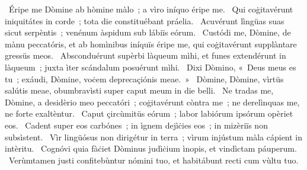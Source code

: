 \psalmChapterWithInscription{}
{ }
{%
~Éripe me Dòmine ab hòmine màlo~; a vìro iníquo éripe me. 
~Qui coġitavérunt iniquitátes in corde~; tota die constituébant práelia. 
~Acuvérunt lìngüas suas sicut serpèntis~; venénum àspidum sub lábiïs eórum. 
~Custódi me, Dòmine, de mànu peccatóris, et ab homìnibus iníquïs éripe me, qui coġitavérunt supplàntare gressüs meos. 
~Absconduérunt supèrbi làqueum mìhi, et funes extendérunt in làqueum~; juxta ìter scándalum posuérunt mìhi. 
~Dixi Dòmino, «~Deus meus es tu~; exáudi, Dòmine, voċem deprecaçiónis meae.~»
~Dòmine, Dòmine, vìrtüs salútis meae, obumbravìsti super caput meum in die belli. 
~Ne tradas me, Dòmine, a desidèrio meo peccatóri~; coġitavérunt còntra me~; ne derelìnquas me, ne forte exaltèntur. 
~Caput çircùmitüs eórum~; labor labiórum ipsórum opèriet eos. 
~Cadent super eos carbónes~; in ìgnem dejìċies eos~; in mizèriïs non subsìstent. 
~Vìr lingüósus non dirigétur in terra~; vìrum injústum màla cápient in intèritu. 
~Cognóvi quia fàċiet Dòminus judìċium ìnopis, et vindìctam páuperum. 
~Verùmtamen justi confitebùntur nómini tuo, et habitábunt recti cum vùltu tuo. 
}
